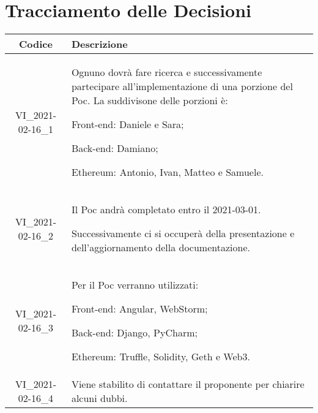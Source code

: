 \section*{Tracciamento delle Decisioni}

\begin{center}
	\begin{longtable}{|c|p{13cm}|}
	\hline
	\rowcolor{lighter-grayer}
	\textbf{Codice} & \textbf{Descrizione} \\
	\hline
	\endfirsthead

	\hline
	VI\_2021-02-16\_1 & Ognuno dovrà fare ricerca e successivamente partecipare all'implementazione di una porzione del Poc.
	La suddivisone delle porzioni è:
	
	Front-end:
	Daniele e Sara;
	
	Back-end:
	Damiano;
	
	Ethereum:
	Antonio, Ivan, Matteo e Samuele. \\
	\hline
	VI\_2021-02-16\_2 & Il Poc andrà completato entro il 2021-03-01.
	
	Successivamente ci si occuperà della presentazione e dell'aggiornamento della documentazione. \\
	\hline
	VI\_2021-02-16\_3 & Per il Poc verranno utilizzati:
	
	Front-end:
	Angular,
	WebStorm;
	
	Back-end:
	Django,
	PyCharm;
	
	Ethereum:
	Truffle, Solidity, Geth e Web3. \\
	\hline
	VI\_2021-02-16\_4 & Viene stabilito di contattare il proponente per chiarire alcuni dubbi. \\
	\hline

	

	\end{longtable}
\end{center}